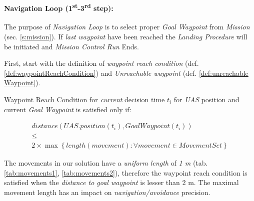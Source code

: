\paragraph{Navigation Loop (1\textsuperscript{st}-3\textsuperscript{rd} step):} The purpose of \emph{Navigation Loop} is to select proper \emph{Goal Waypoint} from \emph{Mission} (sec. \ref{s:mission}). If \emph{last waypoint} have been reached the \emph{Landing Procedure} will be initiated and \emph{Mission Control Run} Ends.

First, start with the definition of \emph{waypoint reach condition} (def. \ref{def:waypointReachCondition}) and \emph{Unreachable waypoint} (def. \ref{def:unreachable Waypoint}).

\newpage
\begin{definition}{Waypoint Reach Condition}\label{def:waypointReachCondition} for \emph{current} decision time $t_i$ for \emph{UAS} position and current \emph{Goal Waypoint} is satisfied only if:

\begin{multline}\label{eq:waypointReachCondition}
    distance(UAS.position(t_i),GoalWaypoint(t_i)) \\\le \\2 \times \max \left\{length(movement):\forall movement\in MovementSet\right\}
\end{multline}

    \begin{note}
        The movements in our solution have a \emph{uniform length} of \emph{1 m} (tab. \ref{tab:movements1}, \ref{tab:movements2}), therefore the waypoint reach condition is satisfied when the \emph{distance to goal waypoint} is lesser than 2 m. The maximal movement length has an impact on \emph{navigation/avoidance} precision.
    \end{note}
\end{definition}

